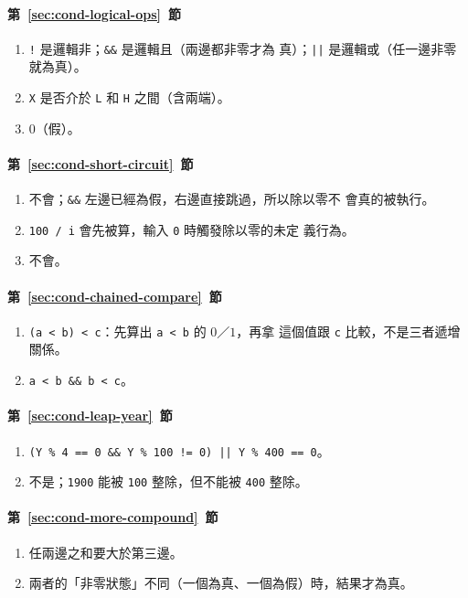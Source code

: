 \paragraph{第~\ref{sec:cond-logical-ops}~節}
\begin{enumerate}
\item \texttt{!} 是邏輯非；\texttt{\&\&} 是邏輯且（兩邊都非零才為
真）；\texttt{||} 是邏輯或（任一邊非零就為真）。
\item \texttt{X} 是否介於 \texttt{L} 和 \texttt{H} 之間（含兩端）。
\item $0$（假）。
\end{enumerate}

\paragraph{第~\ref{sec:cond-short-circuit}~節}
\begin{enumerate}
\item 不會；\texttt{\&\&} 左邊已經為假，右邊直接跳過，所以除以零不
會真的被執行。
\item \texttt{100 / i} 會先被算，輸入 \texttt{0} 時觸發除以零的未定
義行為。
\item 不會。
\end{enumerate}

\paragraph{第~\ref{sec:cond-chained-compare}~節}
\begin{enumerate}
\item \texttt{(a < b) < c}：先算出 \texttt{a < b} 的 $0$／$1$，再拿
這個值跟 \texttt{c} 比較，不是三者遞增關係。
\item \texttt{a < b \&\& b < c}。
\end{enumerate}

\paragraph{第~\ref{sec:cond-leap-year}~節}
\begin{enumerate}
\item \texttt{(Y \% 4 == 0 \&\& Y \% 100 != 0) || Y \% 400 == 0}。
\item 不是；\texttt{1900} 能被 \texttt{100} 整除，但不能被 \texttt{400}
整除。
\end{enumerate}

\paragraph{第~\ref{sec:cond-more-compound}~節}
\begin{enumerate}
\item 任兩邊之和要大於第三邊。
\item 兩者的「非零狀態」不同（一個為真、一個為假）時，結果才為真。
\end{enumerate}


